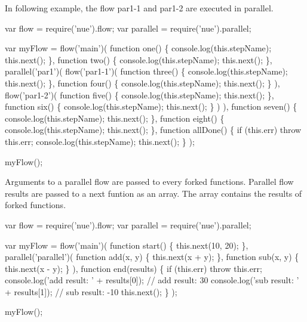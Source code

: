 In following example, the flow {\ttfamily par1-\/1} and {\ttfamily par1-\/2} are executed in parallel.


\begin{DoxyCode}
var flow = require(\textcolor{stringliteral}{'nue'}).flow;
var parallel = require(\textcolor{stringliteral}{'nue'}).parallel;

var myFlow = flow(\textcolor{stringliteral}{'main'})(
  \textcolor{keyword}{function} one() \{
    console.log(this.stepName);
    this.next(); 
  \},
  \textcolor{keyword}{function} two() \{
    console.log(this.stepName);
    this.next(); 
  \},
  parallel(\textcolor{stringliteral}{'par1'})(
    flow(\textcolor{stringliteral}{'par1-1'})(
      \textcolor{keyword}{function} three() \{
        console.log(this.stepName);
        this.next(); 
      \},
      \textcolor{keyword}{function} four() \{
        console.log(this.stepName);
        this.next(); 
      \}
    ),
    flow(\textcolor{stringliteral}{'par1-2'})(
      \textcolor{keyword}{function} five() \{
        console.log(this.stepName);
        this.next(); 
      \},
      \textcolor{keyword}{function} six() \{
        console.log(this.stepName);
        this.next(); 
      \}
    )
  ),
  \textcolor{keyword}{function} seven() \{
    console.log(this.stepName);
    this.next(); 
  \},
  \textcolor{keyword}{function} eight() \{
    console.log(this.stepName);
    this.next(); 
  \},
  \textcolor{keyword}{function} allDone() \{
    \textcolor{keywordflow}{if} (this.err) \textcolor{keywordflow}{throw} this.err;
    console.log(this.stepName);
    this.next();
  \}
);

myFlow();
\end{DoxyCode}


Arguments to a parallel flow are passed to every forked functions. Parallel flow results are passed to a next funtion as an array. The array contains the results of forked functions.


\begin{DoxyCode}
var flow = require(\textcolor{stringliteral}{'nue'}).flow;
var parallel = require(\textcolor{stringliteral}{'nue'}).parallel;

var myFlow = flow(\textcolor{stringliteral}{'main'})(
  \textcolor{keyword}{function} start() \{ 
    this.next(10, 20); 
  \},
  parallel(\textcolor{stringliteral}{'parallel'})(
    \textcolor{keyword}{function} add(x, y) \{ 
      this.next(x + y); 
    \},
    \textcolor{keyword}{function} sub(x, y) \{ 
      this.next(x - y);
    \}
  ),
  \textcolor{keyword}{function} end(results) \{
    \textcolor{keywordflow}{if} (this.err) \textcolor{keywordflow}{throw} this.err;
    console.log(\textcolor{stringliteral}{'add result: '} + results[0]); \textcolor{comment}{// add result: 30 }
    console.log(\textcolor{stringliteral}{'sub result: '} + results[1]); \textcolor{comment}{// sub result: -10}
    this.next();
  \}
);

myFlow();
\end{DoxyCode}


